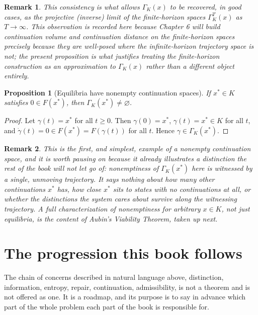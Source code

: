\documentclass[11pt]{report}
\newtheorem{proposition}{Proposition}[chapter]
\newtheorem{remark}{Remark}[chapter]
\begin{document}
\begin{remark}
This consistency is what allows $\Gamma_K(x)$ to be recovered, in good
cases, as the projective (inverse) limit of the finite-horizon spaces
$\Gamma_K^T(x)$ as $T \to \infty$. This observation is recorded here
because Chapter 6 will build continuation volume and continuation
distance on the finite-horizon spaces precisely because they are
well-posed where the infinite-horizon trajectory space is not; the
present proposition is what justifies treating the finite-horizon
construction as an approximation to $\Gamma_K(x)$ rather than a
different object entirely.
\end{remark}

\begin{proposition}[Equilibria have nonempty continuation spaces]
If $x^\ast \in K$ satisfies $0 \in F(x^\ast)$, then $\Gamma_K(x^\ast) \neq \varnothing$.
\end{proposition}
\begin{proof}
Let $\gamma(t) = x^\ast$ for all $t \geq 0$. Then $\gamma(0) = x^\ast$,
$\gamma(t) = x^\ast \in K$ for all $t$, and $\dot\gamma(t) = 0 \in F(x^\ast) = F(\gamma(t))$
for all $t$. Hence $\gamma \in \Gamma_K(x^\ast)$.
\end{proof}

\begin{remark}
This is the first, and simplest, example of a nonempty continuation
space, and it is worth pausing on because it already illustrates a
distinction the rest of the book will not let go of: nonemptiness of
$\Gamma_K(x^\ast)$ here is witnessed by a single, unmoving trajectory. It
says nothing about how many other continuations $x^\ast$ has, how close
$x^\ast$ sits to states with no continuations at all, or whether the
distinctions the system cares about survive along the witnessing
trajectory. A full characterization of nonemptiness for arbitrary
$x \in K$, not just equilibria, is the content of Aubin's Viability
Theorem, taken up next.
\end{remark}

\section*{The progression this book follows}

The chain of concerns described in natural language above, distinction,
information, entropy, repair, continuation, admissibility, is not a
theorem and is not offered as one. It is a roadmap, and its purpose is to
say in advance which part of the whole problem each part of the book is
responsible for.
\end{document}
